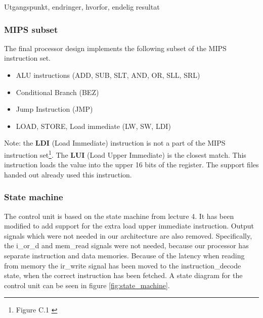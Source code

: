 Utgangspunkt, endringer, hvorfor, endelig resultat

\subsubsection{MIPS subset}

The final processor design implements the following subset of the MIPS instruction set.

\begin{itemize}
    \item ALU instructions (ADD, SUB, SLT, AND, OR, SLL, SRL)
    \item Conditional Branch (BEZ)
    \item Jump Instruction (JMP)
    \item LOAD, STORE, Load immediate (LW, SW, LDI)
\end{itemize}

Note: the {\bf LDI} (Load Immediate) instruction is not a part of the MIPS instruction set\footnote{Figure C.1 \cite[p.66]{compendium}}.
The {\bf LUI} (Load Upper Immediate) is the closest match.
This instruction loads the value into the upper 16 bits of the register.
The support files handed out already used this instruction.

\subsubsection{State machine}

The control unit is based on the state machine from lecture 4. \cite{lecture-4}
It has been modified to add support for the extra load upper immediate instruction.
Output signals which were not needed in our architecture are also removed.
Specifically, the i\_or\_d and mem\_read signals were not needed, because our processor has separate instruction and data memories.
Because of the latency when reading from memory the ir\_write signal has been moved to the instruction\_decode state, when the correct instruction has been fetched.
A state diagram for the control unit can be seen in figure \ref{fig:state_machine}.

